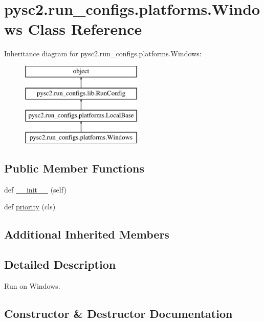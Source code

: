 \hypertarget{classpysc2_1_1run__configs_1_1platforms_1_1_windows}{}\section{pysc2.\+run\+\_\+configs.\+platforms.\+Windows Class Reference}
\label{classpysc2_1_1run__configs_1_1platforms_1_1_windows}
Inheritance diagram for pysc2.\+run\+\_\+configs.\+platforms.\+Windows\+:\begin{figure}[H]
\begin{center}
\leavevmode
\includegraphics[height=4.000000cm]{classpysc2_1_1run__configs_1_1platforms_1_1_windows}
\end{center}
\end{figure}
\subsection*{Public Member Functions}
\begin{DoxyCompactItemize}
\item 
def \mbox{\hyperlink{classpysc2_1_1run__configs_1_1platforms_1_1_windows_a56c7cfef46b410cfb1d7eddd36dba495}{\+\_\+\+\_\+init\+\_\+\+\_\+}} (self)
\item 
def \mbox{\hyperlink{classpysc2_1_1run__configs_1_1platforms_1_1_windows_aeed882f1f779c7209baad142fcf49a43}{priority}} (cls)
\end{DoxyCompactItemize}
\subsection*{Additional Inherited Members}


\subsection{Detailed Description}
\begin{DoxyVerb}Run on Windows.\end{DoxyVerb}
 

\subsection{Constructor \& Destructor Documentation}
\mbox{\label{classpysc2_1_1run__configs_1_1platforms_1_1_windows_a56c7cfef46b410cfb1d7eddd36dba495}} 

